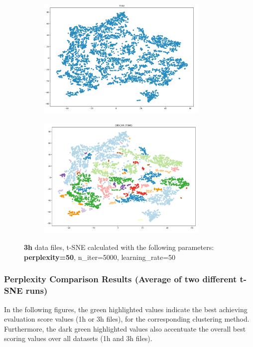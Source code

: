 \begin{figure}[H]
  \centering
	\begin{subfigure}{.5\textwidth}
    \centering
    \includegraphics[width=0.9\textwidth]{./images/tsneParametersTest/perplexity/perp50-3hTSNE.png}
  \end{subfigure}%
  \begin{subfigure}{.5\textwidth}
    \centering
    \includegraphics[width=0.9\textwidth]{./images/tsneParametersTest/perplexity/perp50-3hDBSCAN.png}
	\end{subfigure}
	\caption{\textbf{3h} data files, t-SNE calculated with the following parameters: \textbf{perplexity=50}, n\_iter=5000, learning\_rate=50}
  \label{figure:3hperp50TSNE}
\end{figure}





\subsubsection{Perplexity Comparison Results (Average of two different t-SNE runs)}
\label{appendix:compareAveragePerplexity}
In the following figures, the green highlighted values indicate the best achieving evaluation score values (1h or 3h files), for the corresponding clustering method. Furthermore, the dark green highlighted values also accentuate the overall best scoring values over all datasets (1h and 3h files).


